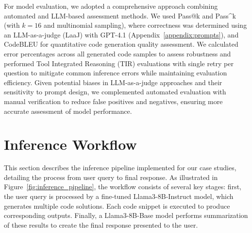 For model evaluation, we adopted a comprehensive approach combining automated and LLM-based assessment methods. We used Pass@k and Pass\textasciicircum k \citep{Levi2024SimpleModelInferenceScalingLaws} (with $k=16$ and multinomial sampling), where correctness was determined using an LLM-as-a-judge (LaaJ) \citep{Li2025LLMJudge} with GPT-4.1 (Appendix~\ref{appendix:prompts}), and CodeBLEU \citep{Ren2020CodeBLEU} for quantitative code generation quality assessment. We calculated error percentages across all generated code samples to assess robustness and performed Tool Integrated Reasoning (TIR) \citep{Fleureau2024NuminaMath} evaluations with single retry per question to mitigate common inference errors while maintaining evaluation efficiency. Given potential biases in LLM-as-a-judge approaches and their sensitivity to prompt design, we complemented automated evaluation with manual verification to reduce false positives and negatives, ensuring more accurate assessment of model performance. 




\section{Inference Workflow}

This section describes the inference pipeline implemented for our case studies, detailing the process from user query to final response. As illustrated in Figure~\ref{fig:inference_pipeline}, the workflow consists of several key stages: first, the user query is processed by a fine-tuned Llama3-8B-Instruct model, which generates multiple code solutions. Each code snippet is executed to produce corresponding outputs. Finally, a Llama3-8B-Base model performs summarization of these results to create the final response presented to the user.

